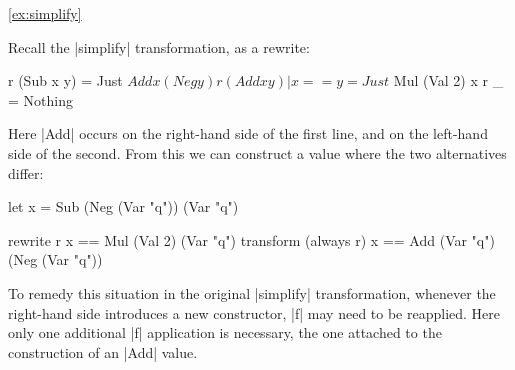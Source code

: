 \begin{examplerevisit}{\ref{ex:simplify}}

Recall the |simplify| transformation, as a rewrite:

\begin{code}
r (Sub x y)           = Just $ Add x (Neg y)
r (Add x y) | x == y  = Just $ Mul (Val 2) x
r _                   = Nothing
\end{code}

Here |Add| occurs on the right-hand side of the first line, and on the left-hand side of the second. From this we can construct a value where the two alternatives differ:

\ignore\begin{code}
let x = Sub (Neg (Var "q")) (Var "q")

rewrite    r           x == Mul (Val 2) (Var "q")
transform  (always r)  x == Add (Var "q") (Neg (Var "q"))
\end{code}

To remedy this situation in the original |simplify| transformation, whenever the right-hand side introduces a new constructor, |f| may need to be reapplied. Here only one additional |f| application is necessary, the one attached to the construction of an |Add| value.

\codeexample
\end{examplerevisit}

